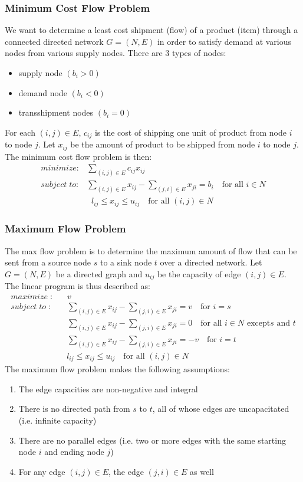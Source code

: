 \documentclass[11pt]{article}
\begin{document}
\subsubsection{Minimum Cost Flow Problem}
We want to determine a least cost shipment (flow) of a product (item) through a connected directed network $G = (N, E)$ in order to satisfy demand at various nodes from various supply nodes. There are 3 types of nodes:
\begin{itemize}
\item supply node $(b_i > 0)$
\item demand node $(b_i < 0)$
\item transshipment nodes $(b_i = 0)$
\end{itemize}
For each $(i, j) \in E$, $c_{ij}$ is the cost of shipping one unit of product from node $i$ to node $j$.  Let $x_{ij}$ be the amount of product to be shipped from node $i$ to node $j$.  The minimum cost flow problem is then:
\begin{align*}
minimize : & \sum_{(i,j) \in E} c_{ij}x_{ij}  \\ 
subject \; to : & \sum_{(i,j) \in E} x_{ij} - \sum_{(j,i) \in E} x_{ji} = b_i\quad \text{for all } i \in N \\
& \; \; l_{ij} \leq x_{ij} \leq u_{ij} \quad  \text{for all } (i,j) \in N
\end{align*}
\subsubsection{Maximum Flow Problem}
The max flow problem is to determine the maximum amount of flow that can be sent from a source node $s$ to a sink node $t$ over a directed network. Let $G = (N, E)$ be a directed graph and $u_{ij}$ be the capacity of edge $(i, j) \in E$. The linear program is thus described as:
\begin{align*}
maximize \; : & \; \; \; v \\ 
subject \; to  \;: & \; \; \; \sum_{(i,j) \in E} x_{ij} - \sum_{(j,i) \in E} x_{ji} =v \quad \text{for } i =s\\
& \; \; \; \sum_{(i,j) \in E} x_{ij} - \sum_{(j,i) \in E} x_{ji} =0 \quad \text{for all } i \in N  \text{ except} s \text{ and } t \\
& \; \; \; \sum_{(i,j) \in E} x_{ij} - \sum_{(j,i) \in E} x_{ji} =-v \quad \text{for } i =t\\
& \; \; \: l_{ij} \leq x_{ij} \leq u_{ij} \quad  \text{for all } (i,j) \in N
\end{align*}
The maximum flow problem makes the following assumptions:
\begin{enumerate}
\item The edge capacities are non-negative and integral
\item There is no directed path from $s$ to $t$, all of whose edges are uncapacitated (i.e. infinite capacity)
\item There are no parallel edges (i.e. two or more edges with the same starting node $i$ and ending node $j$)
\item For any edge $(i,j) \in E$, the edge $(j,i) \in E$ as well
\end{enumerate}
\pagebreak
\end{document}
